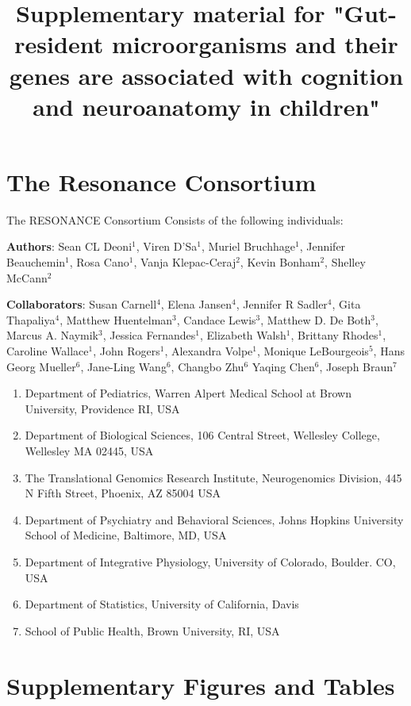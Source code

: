 \documentclass{article}
\title{Supplementary material for "Gut-resident microorganisms and their genes are associated with cognition and neuroanatomy in children"}
\begin{document}
\baselineskip24pt

\maketitle

\newpage
\section*{The Resonance Consortium}

The RESONANCE Consortium Consists of the following individuals:

\textbf{Authors}: 
Sean CL Deoni$^{1}$, Viren D'Sa$^{1}$, Muriel Bruchhage$^{1}$, Jennifer Beauchemin$^{1}$, Rosa Cano$^{1}$, 
Vanja Klepac-Ceraj$^{2}$, Kevin Bonham$^{2}$, Shelley McCann$^{2}$

\textbf{Collaborators}:
Susan Carnell$^{4}$, Elena Jansen$^{4}$, Jennifer R Sadler$^{4}$, Gita Thapaliya$^{4}$,
Matthew Huentelman$^{3}$, Candace Lewis$^{3}$, Matthew D. De Both$^{3}$, Marcus A. Naymik$^{3}$,
Jessica Fernandes$^{1}$, Elizabeth Walsh$^{1}$, Brittany Rhodes$^{1}$,
Caroline Wallace$^{1}$, John Rogers$^{1}$,
Alexandra Volpe$^{1}$, 
Monique LeBourgeois$^{5}$,
Hans Georg Mueller$^{6}$, Jane-Ling Wang$^{6}$, Changbo Zhu$^{6}$ Yaqing Chen$^{6}$,
Joseph Braun$^{7}$



\begin{enumerate}[noitemsep]
  \item Department of Pediatrics, Warren Alpert Medical School at Brown University, Providence RI, USA
  \item Department of Biological Sciences, 106 Central Street, Wellesley College, Wellesley MA 02445, USA
  \item The Translational Genomics Research Institute, Neurogenomics Division, 445 N Fifth Street, Phoenix, AZ 85004 USA
  \item Department of Psychiatry and Behavioral Sciences, Johns Hopkins University School of Medicine, Baltimore, MD, USA
  \item Department of Integrative Physiology, University of Colorado, Boulder. CO, USA
  \item Department of Statistics, University of California, Davis
  \item School of Public Health, Brown University, RI, USA
\end{enumerate}

\section*{Supplementary Figures and Tables}
\end{document}
